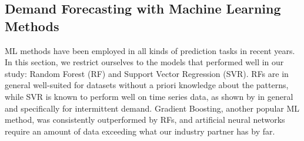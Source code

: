 \subsection{Demand Forecasting with Machine Learning Methods}
\label{ml_methods}

ML methods have been employed in all kinds of prediction tasks in recent
    years.
In this section, we restrict ourselves to the models that performed well in
    our study: Random Forest (RF) and Support Vector Regression (SVR).
RFs are in general well-suited for datasets without a priori knowledge about
    the patterns, while SVR is known to perform well on time series data, as
    shown by \cite{hansen2006} in general and \cite{bao2004} specifically for
    intermittent demand.
Gradient Boosting, another popular ML method, was consistently outperformed by
    RFs, and artificial neural networks require an amount of data
    exceeding what our industry partner has by far.

